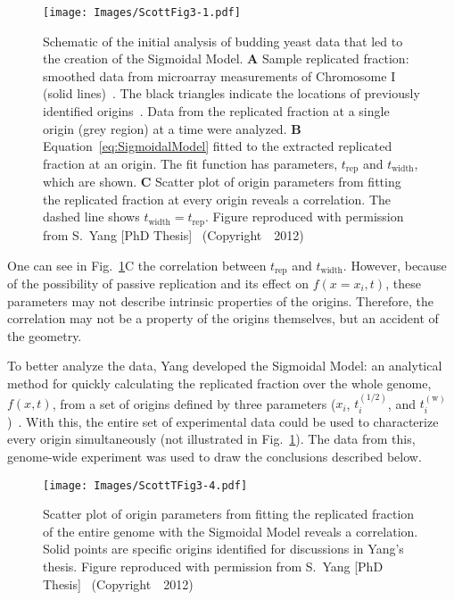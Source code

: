 {	\begin{figure}[tbh]
		\begin{center}
			\texttt{[image: Images/ScottFig3-1.pdf]}
		\end{center}
			\caption[Early analysis of budding yeast]{\label{fig:SigmoidalModel} Schematic of the initial analysis of budding yeast data that led to the creation of the Sigmoidal Model.
				\textbf{A} Sample replicated fraction: smoothed data from microarray measurements of Chromosome I (solid lines)~\cite{McCuneMicroArray}.
				The black triangles indicate the locations of previously identified origins~\cite{OriginLocations}.
				Data from the replicated fraction at a single origin (grey region) at a time were analyzed.
				\textbf{B} Equation~\ref{eq:SigmoidalModel} fitted to the extracted replicated fraction at an origin.
				The fit function has parameters, $t_{\text{rep}}$ and $t_{\text{width}}$, which are shown.
				\textbf{C} Scatter plot of origin parameters from fitting the replicated fraction at every origin reveals a correlation.
				The dashed line shows $t_{\text{width}}=t_{\text{rep}}$.
				Figure reproduced with permission from S.~Yang [PhD Thesis]~\cite{ScottsThesis} (Copyright~\textcopyright~2012)}
	\end{figure}
	
	One can see in Fig.~\ref{fig:SigmoidalModel}C the correlation between $t_\text{rep}$ and $t_\text{width}$.
	However, because of the possibility of passive replication and its effect on $f(x=x_i,t)$, these parameters may not describe intrinsic properties of the origins.
	Therefore, the correlation may not be a property of the origins themselves, but an accident of the geometry.
	
	To better analyze the data, Yang developed the Sigmoidal Model: an analytical method for quickly calculating the replicated fraction over the whole genome, $f(x,t)$, from a set of origins defined by three parameters ($x_i$, $t_i^{(1/2)}$, and $t^{(\text{w})}_i$)~\cite{ScottsThesis}.
	With this, the entire set of experimental data could be used to characterize every origin simultaneously (not illustrated in Fig.~\ref{fig:SigmoidalModel}).
	The data from this, genome-wide experiment was used to draw the conclusions described below.
	
	\begin{SCfigure}[1][tbh]
		\texttt{[image: Images/ScottTFig3-4.pdf]}
		\caption[Sigmoidal model]{\label{fig:SigmoidalModel2} Scatter plot of origin parameters from fitting the replicated fraction of the entire genome with the Sigmoidal Model reveals a correlation.
			Solid points are specific origins identified for discussions in Yang's thesis.
			Figure reproduced with permission from S.~Yang [PhD Thesis]~\cite{ScottsThesis} (Copyright~\textcopyright~2012)}
	\end{SCfigure}
	
}
